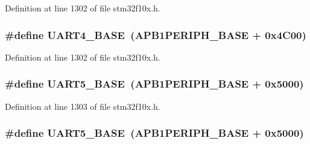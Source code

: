 Definition at line 1302 of file stm32f10x.\+h.

\subsubsection[{\texorpdfstring{U\+A\+R\+T4\+\_\+\+B\+A\+SE}{UART4_BASE}}]{\setlength{\rightskip}{0pt plus 5cm}\#define U\+A\+R\+T4\+\_\+\+B\+A\+SE~({\bf A\+P\+B1\+P\+E\+R\+I\+P\+H\+\_\+\+B\+A\+SE} + 0x4\+C00)}\hypertarget{group___peripheral__memory__map_ga94d92270bf587ccdc3a37a5bb5d20467}{}\label{group___peripheral__memory__map_ga94d92270bf587ccdc3a37a5bb5d20467}


Definition at line 1302 of file stm32f10x.\+h.

\subsubsection[{\texorpdfstring{U\+A\+R\+T5\+\_\+\+B\+A\+SE}{UART5_BASE}}]{\setlength{\rightskip}{0pt plus 5cm}\#define U\+A\+R\+T5\+\_\+\+B\+A\+SE~({\bf A\+P\+B1\+P\+E\+R\+I\+P\+H\+\_\+\+B\+A\+SE} + 0x5000)}\hypertarget{group___peripheral__memory__map_gaa155689c0e206e6994951dc3cf31052a}{}\label{group___peripheral__memory__map_gaa155689c0e206e6994951dc3cf31052a}


Definition at line 1303 of file stm32f10x.\+h.

\subsubsection[{\texorpdfstring{U\+A\+R\+T5\+\_\+\+B\+A\+SE}{UART5_BASE}}]{\setlength{\rightskip}{0pt plus 5cm}\#define U\+A\+R\+T5\+\_\+\+B\+A\+SE~({\bf A\+P\+B1\+P\+E\+R\+I\+P\+H\+\_\+\+B\+A\+SE} + 0x5000)}\hypertarget{group___peripheral__memory__map_gaa155689c0e206e6994951dc3cf31052a}{}\label{group___peripheral__memory__map_gaa155689c0e206e6994951dc3cf31052a}


